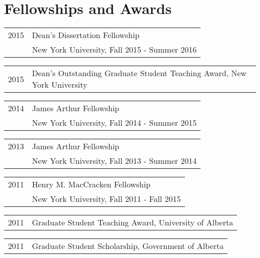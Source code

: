 \documentclass[letterpaper]{article}
\renewenvironment{itemize}{
  \begin{list}{}{
    \setlength{\leftmargin}{1.5em}
  }
}{
  \end{list}
}
\begin{document}
\section*{Fellowships and Awards}
\begin{itemize}
\item \begin{tabular}{ll}
2015 & Dean's Dissertation Fellowship \\
& New York University, Fall 2015 - Summer 2016 \\
\end{tabular}

\item \begin{tabular}{ll}
2015 & Dean's Outstanding Graduate Student Teaching Award, New York University
\end{tabular}

\item \begin{tabular}{ll}
2014 & James Arthur Fellowship \\
& New York University, Fall 2014 - Summer 2015 \\
\end{tabular}

\item \begin{tabular}{ll}
2013 & James Arthur Fellowship \\
& New York University, Fall 2013 - Summer 2014 \\
\end{tabular}

\item \begin{tabular}{ll}
2011 & Henry M. MacCracken Fellowship \\
& New York University, Fall 2011 - Fall 2015 \\
\end{tabular}

\item \begin{tabular}{ll}
2011 & Graduate Student Teaching Award, University of Alberta \\
\end{tabular}

\item \begin{tabular}{ll}
2011 & Graduate Student Scholarship, Government of Alberta \\
\end{tabular}


\end{itemize}
\end{document}
